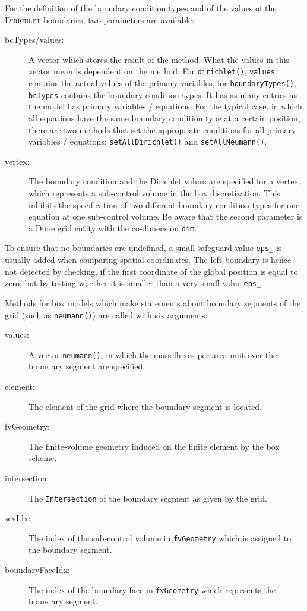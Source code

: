 For the definition of the boundary condition types and of the
values of the \textsc{Dirichlet} boundaries, two parameters are
available:
\begin{description}
 \item [bcTypes/values:]  A vector which stores the result of the method. What
  the values in this vector mean is dependent on the method: For
  \texttt{dirichlet()}, \texttt{values} contains the actual values of the primary
  variables, for \texttt{boundaryTypes()}, \texttt{bcTypes} contains the boundary
  condition types. It has as many entries as the model has primary variables / equations.
  For the typical case, in which all equations have the same boundary
  condition type at a certain position, there are two methods that set the appropriate conditions
  for all primary variables / equations: \texttt{setAllDirichlet()} and \texttt{setAllNeumann()}.
\item [vertex:] The boundary condition and the Dirichlet values are
  specified for a vertex, which represents a sub-control volume in the box
  discretization. This inhibits the specification of two different
  boundary condition types for one equation at one sub-control
  volume.  Be aware that the second parameter is a Dune grid entity
  with the co-dimension \texttt{dim}.
\end{description}

To ensure that no boundaries are undefined, a small safeguard value
\texttt{eps\_} is usually added when comparing spatial
coordinates. The left boundary is hence not detected by checking, if the
first coordinate of the global position is equal to zero, but by testing whether it is
smaller than a very small value \texttt{eps\_}.

Methods for box models which make statements about boundary segments of the grid
(such as \texttt{neumann()}) are called with six arguments:
\begin{description}
\item[values:] A vector \texttt{neumann()}, in which the mass fluxes per area unit
  over the boundary segment are specified.
\item[element:] The element of the grid where the boundary segment
  is located.
\item[fvGeometry:] The finite-volume geometry induced on the
  finite element by the box scheme.
\item[intersection:] The \texttt{Intersection} of the boundary segment as given by the grid.
\item[scvIdx:] The index of the sub-control volume in
  \texttt{fvGeometry} which is assigned to the boundary segment.
\item[boundaryFaceIdx:] The index of the boundary face in
  \texttt{fvGeometry} which represents the boundary segment.
\end{description}

